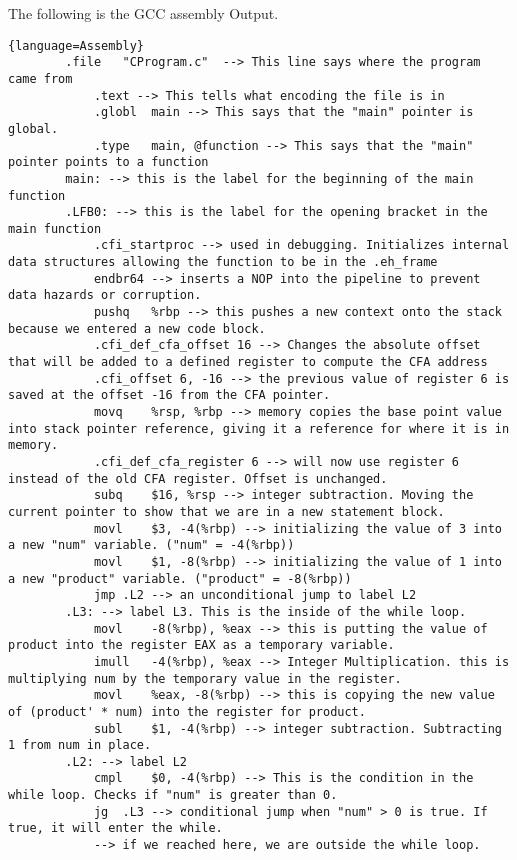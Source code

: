 \documentclass{article}
\theoremstyle{theorem}
\theoremstyle{definition}
\theoremstyle{remark}
\begin{document}
The following is the GCC assembly Output.

\begin{lstlisting}{language=Assembly}
    	.file	"CProgram.c"  --> This line says where the program came from
        	.text --> This tells what encoding the file is in
        	.globl	main --> This says that the "main" pointer is global.
        	.type	main, @function --> This says that the "main" pointer points to a function
        main: --> this is the label for the beginning of the main function
        .LFB0: --> this is the label for the opening bracket in the main function
        	.cfi_startproc --> used in debugging. Initializes internal data structures allowing the function to be in the .eh_frame 
        	endbr64 --> inserts a NOP into the pipeline to prevent data hazards or corruption.
        	pushq	%rbp --> this pushes a new context onto the stack because we entered a new code block.
        	.cfi_def_cfa_offset 16 --> Changes the absolute offset that will be added to a defined register to compute the CFA address
        	.cfi_offset 6, -16 --> the previous value of register 6 is saved at the offset -16 from the CFA pointer.
        	movq	%rsp, %rbp --> memory copies the base point value into stack pointer reference, giving it a reference for where it is in memory.
        	.cfi_def_cfa_register 6 --> will now use register 6 instead of the old CFA register. Offset is unchanged.
        	subq	$16, %rsp --> integer subtraction. Moving the current pointer to show that we are in a new statement block.
        	movl	$3, -4(%rbp) --> initializing the value of 3 into a new "num" variable. ("num" = -4(%rbp))
        	movl	$1, -8(%rbp) --> initializing the value of 1 into a new "product" variable. ("product" = -8(%rbp))
        	jmp	.L2 --> an unconditional jump to label L2
        .L3: --> label L3. This is the inside of the while loop.
        	movl	-8(%rbp), %eax --> this is putting the value of product into the register EAX as a temporary variable.
        	imull	-4(%rbp), %eax --> Integer Multiplication. this is multiplying num by the temporary value in the register.
        	movl	%eax, -8(%rbp) --> this is copying the new value of (product' * num) into the register for product.
        	subl	$1, -4(%rbp) --> integer subtraction. Subtracting 1 from num in place.
        .L2: --> label L2
        	cmpl	$0, -4(%rbp) --> This is the condition in the while loop. Checks if "num" is greater than 0.
        	jg	.L3 --> conditional jump when "num" > 0 is true. If true, it will enter the while.
        	--> if we reached here, we are outside the while loop.

\end{lstlisting}
\end{document}
